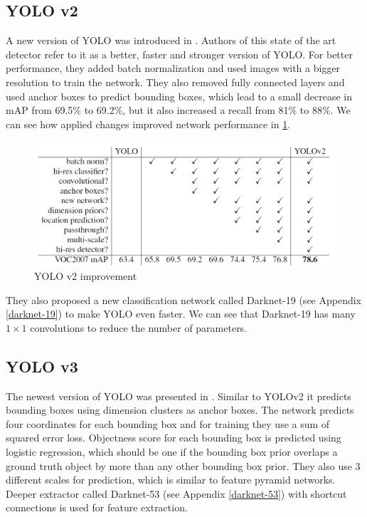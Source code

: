 \documentclass[twoside]{ctuthesis}
\theoremstyle{plain}
\theoremstyle{definition}
\theoremstyle{note}
\begin{document}
\subsection{YOLO v2}
A new version of YOLO was introduced in \cite{redmon_farhadi_2017}. Authors of this state of the art detector refer to it as a better, faster and stronger version of YOLO. For better performance, they added batch normalization and used images with a bigger resolution to train the network. They also removed fully connected layers and used anchor boxes to predict bounding boxes, which lead to a small decrease in mAP from 69.5\% to 69.2\%, but it also increased a recall from 81\% to 88\%. We can see how applied changes improved network performance in \ref{yolov2_improve}.
\begin{figure}[H]
\caption{YOLO v2 improvement\cite{redmon_farhadi_2017}}
\label{yolov2_improve}
\includegraphics[width=\textwidth]{images/used_networks/yolov2_improve.png}
\end{figure}
They also proposed a new classification network called Darknet-19 (see Appendix \ref{darknet-19}) to make YOLO even faster. We can see that Darknet-19 has many $1\times 1$ convolutions to reduce the number of parameters. 

\subsection{YOLO v3}
The newest version of YOLO was presented in \cite{Redmon2018YOLOv3AI}. Similar to YOLOv2 it predicts bounding boxes using dimension clusters as anchor boxes. The network predicts four coordinates for each bounding box and for training they use a sum of squared error loss. Objectness score for each bounding box is predicted using logistic regression, which should be one if the bounding box prior overlaps a ground truth object by more than any other bounding box prior. 
They also use 3 different scales for prediction, which is similar to feature pyramid networks. Deeper extractor called Darknet-53 (see Appendix \ref{darknet-53}) with shortcut connections is used for feature extraction.
\end{document}
